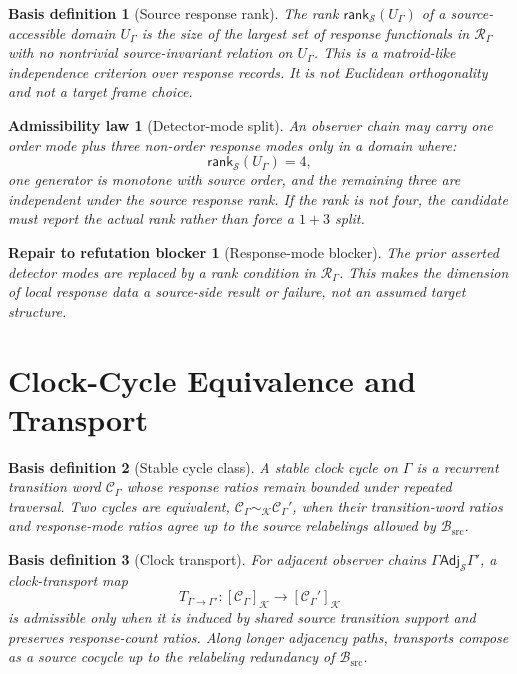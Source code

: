 \documentclass[11pt]{article}
\newcommand{\Adj}{\mathsf{Adj}_{\mathcal{S}}}
\newcommand{\Rank}{\mathsf{rank}_{\mathcal{S}}}
\newcommand{\RespAlg}{\mathcal{R}_{\Gamma}}
\newcommand{\Cycle}{\mathcal{C}_{\Gamma}}
\newcommand{\Basis}{\mathcal{B}_{\mathrm{src}}}
\newtheorem{basisdefinition}{Basis definition}
\newtheorem{admissibility}{Admissibility law}
\newtheorem{repair}{Repair to refutation blocker}
\begin{document}
\begin{basisdefinition}[Source response rank]
The rank \(\Rank(U_{\Gamma})\) of a source-accessible domain \(U_{\Gamma}\) is
the size of the largest set of response functionals in \(\RespAlg\) with no
nontrivial source-invariant relation on \(U_{\Gamma}\). This is a matroid-like
independence criterion over response records. It is not Euclidean
orthogonality and not a target frame choice.
\end{basisdefinition}

\begin{admissibility}[Detector-mode split]
An observer chain may carry one order mode plus three non-order response modes
only in a domain where:
\[
\Rank(U_{\Gamma})=4,
\]
one generator is monotone with source order, and the remaining three are
independent under the source response rank. If the rank is not four, the
candidate must report the actual rank rather than force a \(1+3\) split.
\end{admissibility}

\begin{repair}[Response-mode blocker]
The prior asserted detector modes are replaced by a rank condition in
\(\RespAlg\). This makes the dimension of local response data a source-side
result or failure, not an assumed target structure.
\end{repair}

\section{Clock-Cycle Equivalence and Transport}

\begin{basisdefinition}[Stable cycle class]
A stable clock cycle on \(\Gamma\) is a recurrent transition word
\(\Cycle\) whose response ratios remain bounded under repeated traversal.
Two cycles are equivalent, \(\Cycle\sim_{\mathcal{K}}\Cycle'\), when their
transition-word ratios and response-mode ratios agree up to the source
relabelings allowed by \(\Basis\).
\end{basisdefinition}

\begin{basisdefinition}[Clock transport]
For adjacent observer chains \(\Gamma\Adj\Gamma'\), a clock-transport map
\[
T_{\Gamma\to\Gamma'}:
[\Cycle]_{\mathcal{K}}
\longrightarrow
[\Cycle']_{\mathcal{K}}
\]
is admissible only when it is induced by shared source transition support and
preserves response-count ratios. Along longer adjacency paths, transports
compose as a source cocycle up to the relabeling redundancy of \(\Basis\).
\end{basisdefinition}
\end{document}
